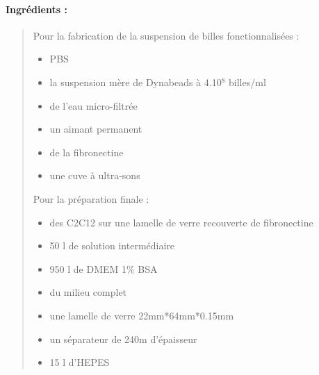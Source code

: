 	\paragraph{Ingrédients : }
	\begin{quote}
	Pour la fabrication de la suspension de billes fonctionnalisées : 
	\begin{itemize}
	\item PBS
	\item la suspension mère de Dynabeads à 4.10$^{8}$ billes/ml
	\item de l'eau micro-filtrée 
	\item un aimant permanent
	\item de la fibronectine
	\item une cuve à ultra-sons
	\end{itemize}
	Pour la préparation finale : 
	\begin{itemize}
	\item des C2C12 sur une lamelle de verre recouverte de fibronectine
	\item 50 \micro l de solution intermédiaire
	\item 950 \micro l de DMEM 1\% BSA
	\item du milieu complet
	\item une lamelle de verre 22mm*64mm*0.15mm
	\item un séparateur de 240\micro m d'épaisseur
	\item 15 \micro l d'HEPES
	\end{itemize}
	\end{quote}
	
